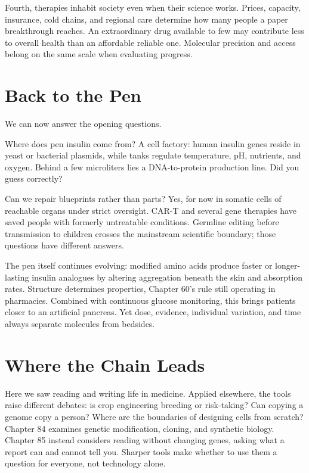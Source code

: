 Fourth, therapies inhabit society even when their science works. Prices, capacity, insurance, cold chains, and regional care determine how many people a paper breakthrough reaches. An extraordinary drug available to few may contribute less to overall health than an affordable reliable one. Molecular precision and access belong on the same scale when evaluating progress.

\section{Back to the Pen}

We can now answer the opening questions.

Where does pen insulin come from? A cell factory: human insulin genes reside in yeast or bacterial plasmids, while tanks regulate temperature, pH, nutrients, and oxygen. Behind a few microliters lies a DNA-to-protein production line. Did you guess correctly?

Can we repair blueprints rather than parts? Yes, for now in somatic cells of reachable organs under strict oversight. CAR-T and several gene therapies have saved people with formerly untreatable conditions. Germline editing before transmission to children crosses the mainstream scientific boundary; those questions have different answers.

The pen itself continues evolving: modified amino acids produce faster or longer-lasting insulin analogues by altering aggregation beneath the skin and absorption rates. Structure determines properties, Chapter 60's rule still operating in pharmacies. Combined with continuous glucose monitoring, this brings patients closer to an artificial pancreas. Yet dose, evidence, individual variation, and time always separate molecules from bedsides.

\section{Where the Chain Leads}

Here we saw reading and writing life in medicine. Applied elsewhere, the tools raise different debates: is crop engineering breeding or risk-taking? Can copying a genome copy a person? Where are the boundaries of designing cells from scratch? Chapter 84 examines genetic modification, cloning, and synthetic biology. Chapter 85 instead considers reading without changing genes, asking what a report can and cannot tell you. Sharper tools make whether to use them a question for everyone, not technology alone.

